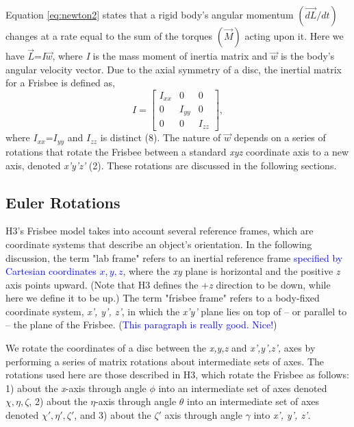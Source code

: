 \documentclass[a4paper,12pt, oneside]{article}
\newcommand{\blue}[1]{\textcolor{blue}{#1}}
\begin{document}
Equation \ref{eq:newton2} states that a rigid body's angular momentum $(\vec{dL}/dt)$ changes at a rate equal to the sum of the torques $(\vec{M})$ acting upon it. Here we have $\vec{L}$=\textit{I}$\vec{w}$, where \textit{I} is the mass moment of inertia matrix and $\vec{w}$ is the body's angular velocity vector. Due to the axial symmetry of a disc, the inertial matrix for a Frisbee is defined as,  
\begin{equation*}
I=\begin{bmatrix}
I_{xx} & 0 & 0 \\
0 & I_{yy} & 0 \\ 
0 & 0 & I_{zz}
\end{bmatrix},
\end{equation*}
where $I_{xx}$=$I_{yy}$ and $I_{zz}$ is distinct (8).  The nature of $\vec{w}$ depends on a series of rotations that rotate the Frisbee between a standard \textit{xyz} coordinate axis to a new axis, denoted \textit{x'y'z'} (2). These rotations are discussed in the following sections.

\subsection{Euler Rotations} 

H3's Frisbee model takes into account several reference frames, which are coordinate systems that describe an object's orientation.  In the following discussion, the term "lab frame" refers to an inertial reference frame \blue{specified by Cartesian coordinates $x,y,z$}, where the \textit{xy} plane is horizontal and the positive \textit{z} axis points upward.  (Note that H3 defines the +\textit{z} direction to be down, while here we define it to be up.) The term "frisbee frame" refers to a body-fixed coordinate system, \textit{x', y', z'}, in which the \textit{x'y'} plane lies on top of -- or parallel to -- the plane of the Frisbee. (\blue{This paragraph is really good. Nice!})

We rotate the coordinates of a disc between the \textit{x,y,z} and \textit{x',y',z',} axes by performing a series of matrix rotations about intermediate sets of axes.  The rotations used here are those described in H3, which rotate the Frisbee as follows: 1) about the \textit{x}-axis through angle $\phi$ into an intermediate set of axes denoted $\chi,\eta,\zeta$, 2) about the $\eta$-axis through angle $\theta$ into an intermediate set of axes denoted $\chi',\eta',\zeta'$, and 3) about the $\zeta'$ axis through angle $\gamma$ into \textit{x', y', z'}.
\end{document}
